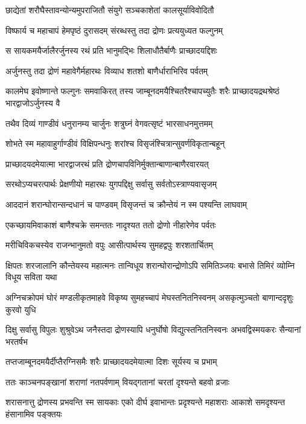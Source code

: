 \twolineshloka
{छाद्येतां शरौघैस्तावन्योन्यमुपराजितौ}
{संयुगे सञ्चकाशेतां कालसूर्याविवोदितौ}


\twolineshloka
{विष्फार्य च महाचापं हेमपृष्ठं दुरासदम्}
{संरब्धस्तु तदा द्रोणः प्रत्ययुध्यत फल्गुनम्}


\twolineshloka
{स सायकमयैर्जालैरर्जुनस्य रथं प्रति}
{भानुमद्भिः शिलाधौतैर्बाणैः प्राच्छादयद्दिशः}


\twolineshloka
{अर्जुनस्तु तदा द्रोणं महावेगैर्महारथः}
{विव्याध शतशो बाणैर्धाराभिरिव पर्वतम्}


\onelineshloka
{कालमेघ इवोष्णान्ते फल्गुनः समवाकिरत्}
\twolineshloka
{तस्य जाम्बूनदमयैश्चितरैश्चापच्युतैः शरैः}
{प्राच्छादयद्रथश्रेष्ठं भारद्वाजोऽर्जुनस्य वै}


\twolineshloka
{तथैव दिव्यं गाण्डीवं धनुरानम्य चार्जुनः}
{शत्रुघ्नं वेगवत्सृष्टं भारसाधनमुत्तमम्}


\twolineshloka
{शोभते स्म महावाहुर्गाण्डीवं विक्षिपन्धनुः}
{शरांश्च विसृजंश्चित्रान्सुवर्णविकृतान्बहून्}


\twolineshloka
{प्राच्छादयदमेयात्मा भारद्वाजरथं प्रति}
{द्रोणचापविनिर्मुक्तान्बाणान्बाणैरवारयत्}


\twolineshloka
{सरथोऽप्यचरत्पार्थः प्रेक्षणीयो महारथः}
{युगपद्दिक्षु सर्वासु सर्वतोऽस्त्राण्यवासृजम्}


\twolineshloka
{आददानं शरान्घोरान्सन्दधानं च पाण्डवम्}
{विसृजन्तं च क्रौन्तेयं न स्म पश्यन्ति लाघवाम्}


\twolineshloka
{एकच्छायमिवाकाशं बाणैश्चक्रे समन्ततः}
{नादृश्यत ततो द्रोणो नीहारेणेव पर्वतः}


\twolineshloka
{मरीचिविकचस्येव राजन्भानुमतो वपुः}
{आसीत्पार्थस्य सुमहद्वपुः शरशतार्चितम्}


\threelineshloka
{क्षिपतः शरजालानि कौन्तेयस्य महात्मनः}
{तान्विधूय शरान्घोरान्द्रोणोऽपि समितिञ्जयः}
{बभासे तिमिरं व्योम्नि विधूय सविता यथा}


\threelineshloka
{अग्निचक्रोपमं घोरं मण्डलीकृतमाहवे}
{विकृष्य सुमहच्चापं मेघस्तनितनिस्वनम्}
{असकृत्मुञ्चतो बाणान्ददृशुः कुरवो युधि}


\threelineshloka
{दिक्षु सर्वासु विपुलः शुश्रुवेऽथ जनैस्तदा}
{द्रोणस्यापि धनुर्घोषो विद्युत्स्तनितनिस्वनः}
{अभवद्विस्मयकरः सैन्यानां भरतर्षभ}


\twolineshloka
{तप्तजाम्बूनदमयैर्दीप्तैरग्निसमैः शरैः}
{प्राच्छादयदमेयात्मा दिशः सूर्यस्य च प्रभाम्}


\twolineshloka
{ततः काञ्चनपङ्खानां शराणां नतपर्वणाम्}
{वियद्गतानां चरतां दृश्यन्ते बहवो व्रजाः}


\threelineshloka
{शरासनात्तु द्रोणस्य प्रभवन्ति स्म सायकाः}
{एको दीर्घ इवाभान्तः प्रदृश्यन्ते महाशराः}
{आकाशे समदृश्यन्त हंसानामिव पङ्क्तयः}



